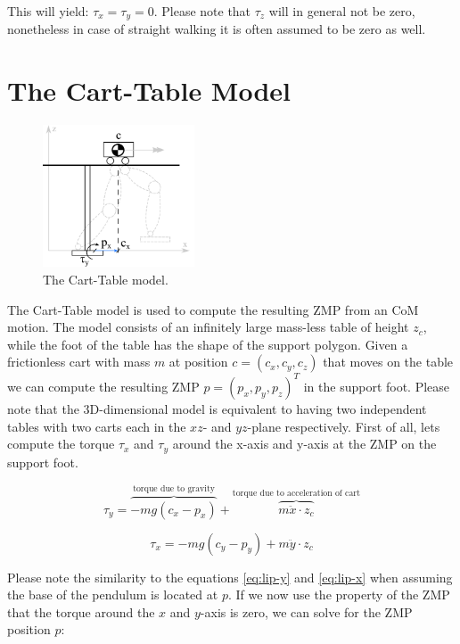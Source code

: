 \documentclass[english,ngerman]{KITreprt}
\begin{document}
This will yield: $\tau_x = \tau_y = 0$. Please note that $\tau_z$ will
in general not be zero, nonetheless in case of straight walking it is
often assumed to be zero as well.

\section{The Cart-Table Model}\label{section:cart-table}

\begin{figure}
  \begin{center}
     \includegraphics[width=0.4\textwidth]{images/carttable.png}
  \end{center}
  \caption{The Cart-Table model.}
\end{figure}

The Cart-Table model is used to compute the resulting ZMP from an CoM
motion. The model consists of an infinitely large mass-less table of
height $z_c$, while the foot of the table has the shape of the support
polygon. Given a frictionless cart with mass $m$ at position
$c = (c_x, c_y, c_z)$ that moves on the table we can compute the
resulting ZMP $p = (p_x, p_y, p_z)^T$ in the support foot. Please note
that the 3D-dimensional model is equivalent to having two independent
tables with two carts each in the $xz$- and $yz$-plane respectively.
First of all, lets compute the torque $\tau_x$ and $\tau_y$ around the
x-axis and y-axis at the ZMP on the support foot.

\begin{equation}
\tau_y = \overbrace{-m g (c_x - p_x)}^{\text{torque due to gravity}} + \overbrace{m \ddot{x} \cdot z_c}^{\text{torque due to acceleration of cart}}
\end{equation}

\begin{equation}
\tau_x = -m g (c_y - p_y) + m \ddot{y} \cdot z_c
\end{equation}

Please note the similarity to the equations \ref{eq:lip-y} and
\ref{eq:lip-x} when assuming the base of the pendulum is located at $p$.
If we now use the property of the ZMP that the torque around the $x$ and
$y$-axis is zero, we can solve for the ZMP position $p$:
\end{document}
